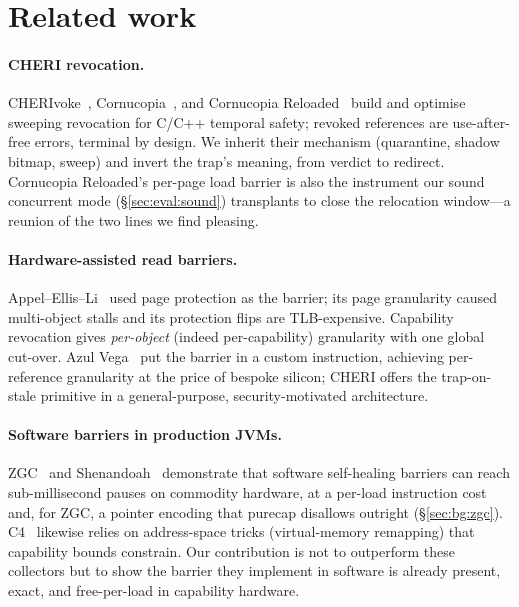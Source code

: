 \documentclass[acmsmall,nonacm,screen]{acmart}
\begin{document}
\section{Related work}
\label{sec:related}

\paragraph{CHERI revocation.} CHERIvoke~\cite{cherivoke},
Cornucopia~\cite{cornucopia}, and Cornucopia
Reloaded~\cite{cornucopia-reloaded} build and optimise sweeping
revocation for C/C++ temporal safety; revoked references are
use-after-free errors, terminal by design. We inherit their mechanism
(quarantine, shadow bitmap, sweep) and invert the trap's meaning, from
verdict to redirect. Cornucopia Reloaded's per-page load barrier is also the instrument
our sound concurrent mode (\S\ref{sec:eval:sound}) transplants to
close the relocation window---a reunion of the two lines we find
pleasing.

\paragraph{Hardware-assisted read barriers.}
Appel--Ellis--Li~\cite{appel-ellis-li} used page protection as the
barrier; its page granularity caused multi-object stalls and its
protection flips are TLB-expensive. Capability revocation gives
\emph{per-object} (indeed per-capability) granularity with one global
cut-over. Azul Vega~\cite{pauseless} put the barrier in a custom
instruction, achieving per-reference granularity at the price of
bespoke silicon; CHERI offers the trap-on-stale primitive in a
general-purpose, security-motivated architecture.

\paragraph{Software barriers in production JVMs.}
ZGC~\cite{zgc-toplas,genzgc} and Shenandoah~\cite{shenandoah}
demonstrate that software self-healing barriers can reach
sub-millisecond pauses on commodity hardware, at a per-load
instruction cost and, for ZGC, a pointer encoding that purecap
disallows outright (\S\ref{sec:bg:zgc}). C4~\cite{c4} likewise relies
on address-space tricks (virtual-memory remapping) that capability
bounds constrain. Our contribution is not to outperform these
collectors but to show the barrier they implement in software is
already present, exact, and free-per-load in capability hardware.
\end{document}
